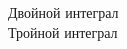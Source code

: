 \documentclass[a4paper]{article}
\begin{document}
Двойной интеграл \\



Тройной интеграл 
 
\end{document}
